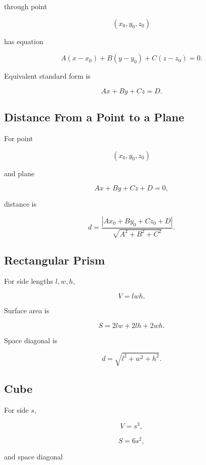through point

\[
(x_0,y_0,z_0)
\]

has equation

\[
\boxed{
A(x-x_0)
+
B(y-y_0)
+
C(z-z_0)
=
0.
}
\]

Equivalent standard form is

\[
\boxed{
Ax+By+Cz=D.
}
\]

\subsection{Distance From a Point to a Plane}
\label{subsec:point-plane-distance}

For point

\[
(x_0,y_0,z_0)
\]

and plane

\[
Ax+By+Cz+D=0,
\]

distance is

\[
\boxed{
d
=
\frac{
|Ax_0+By_0+Cz_0+D|
}{
\sqrt{A^2+B^2+C^2}
}.
}
\]

\subsection{Rectangular Prism}
\label{subsec:rectangular-prism-formulas}

For side lengths \(l,w,h\),

\[
\boxed{
V=lwh.
}
\]

Surface area is

\[
\boxed{
S
=
2lw+2lh+2wh.
}
\]

Space diagonal is

\[
\boxed{
d
=
\sqrt{
l^2+w^2+h^2
}.
}
\]

\subsection{Cube}
\label{subsec:cube-formulas}

For side \(s\),

\[
\boxed{
V=s^3,
}
\]

\[
\boxed{
S=6s^2,
}
\]

and space diagonal

